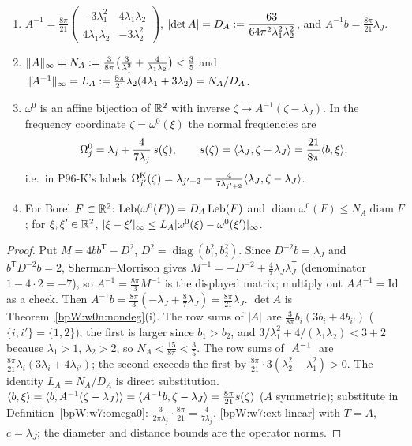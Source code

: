 \begin{lemma}\label{bpW:w7:freqcoords}
\begin{enumerate}[label=(\roman*)]
\item $A^{-1}=\frac{8\pi}{21}\begin{pmatrix}-3\lambda_1^2&4\lambda_1\lambda_2\\4\lambda_1\lambda_2&-3\lambda_2^2\end{pmatrix}$,
  $\lvert \det A\rvert=D_A:=\dfrac{63}{64\pi^2\lambda_1^2\lambda_2^2}$, and $A^{-1}b=\frac{8\pi}{21}\lambda_J$.
\item $\lVert A\rVert_\infty=N_A:=\frac3{8\pi}\bigl(\frac3{\lambda_1^2}+\frac4{\lambda_1\lambda_2}\bigr)<\frac35$ and
  $\lVert A^{-1}\rVert_\infty=L_A:=\frac{8\pi}{21}\lambda_2(4\lambda_1+3\lambda_2)=N_A/D_A$.
\item $\omega^0$ is an affine bijection of $\mathbb{R}^2$ with inverse $\zeta\mapsto A^{-1}(\zeta-\lambda_J)$. In the
  frequency coordinate $\zeta=\omega^0(\xi)$ the normal frequencies are
  \[\Omega^0_j=\lambda_j+\frac{4}{7\lambda_j}\,s(\zeta),\qquad s(\zeta)=\langle \lambda_J,\zeta-\lambda_J\rangle
  =\frac{21}{8\pi}\langle b,\xi\rangle,\]
  i.e.\ in P96-K's labels $\Omega^{\rm K}_{j'}(\zeta)=\lambda_{j'+2}+\frac{4}{7\lambda_{j'+2}}\langle \lambda_J,\zeta-\lambda_J\rangle$.
\item For Borel $F\subset\mathbb{R}^2$: $\operatorname{Leb}(\omega^0(F))=D_A\operatorname{Leb}(F)$ and
  $\operatorname{diam}\omega^0(F)\le N_A\operatorname{diam}F$; for $\xi,\xi'\in\mathbb{R}^2$,
  $\lvert \xi-\xi'\rvert_\infty\le L_A\lvert \omega^0(\xi)-\omega^0(\xi')\rvert_\infty$.
\end{enumerate}
\end{lemma}
\begin{proof}
\label{stepW:w7:inverse}
Put $M=4bb^{\mathsf T}-D^2$, $D^2=\operatorname{diag}(b_1^2,b_2^2)$. Since $D^{-2}b=\lambda_J$ and $b^{\mathsf T}D^{-2}b=2$,
Sherman--Morrison gives $M^{-1}=-D^{-2}+\frac47\lambda_J\lambda_J^{\mathsf T}$ (denominator $1-4\cdot2=-7$), so
$A^{-1}=\frac{8\pi}3M^{-1}$ is the displayed matrix; multiply out $AA^{-1}=\mathrm{Id}$ as a check. Then
$A^{-1}b=\frac{8\pi}3(-\lambda_J+\frac87\lambda_J)=\frac{8\pi}{21}\lambda_J$. $\det A$ is
Theorem~\ref{bpW:w0n:nondeg}(i).
\label{stepW:w7:norms}
The row sums of $\lvert A\rvert$ are $\frac3{8\pi}b_i(3b_i+4b_{i'})$ ($\{i,i'\}=\{1,2\}$); the first is larger since $b_1>b_2$,
and $3/\lambda_1^2+4/(\lambda_1\lambda_2)<3+2$ because $\lambda_1>1$, $\lambda_2>2$, so $N_A<\frac{15}{8\pi}<\frac35$.
The row sums of $\lvert A^{-1}\rvert$ are $\frac{8\pi}{21}\lambda_i(3\lambda_i+4\lambda_{i'})$; the second exceeds the first
by $\frac{8\pi}{21}\cdot3(\lambda_2^2-\lambda_1^2)>0$. The identity $L_A=N_A/D_A$ is direct substitution.
\label{stepW:w7:Omegazeta}
$\langle b,\xi\rangle=\langle b,A^{-1}(\zeta-\lambda_J)\rangle=\langle A^{-1}b,\zeta-\lambda_J\rangle=\frac{8\pi}{21}s(\zeta)$ ($A$ symmetric);
substitute in Definition~\ref{bpW:w7:omega0}: $\frac{3}{2\pi\lambda_j}\cdot\frac{8\pi}{21}=\frac4{7\lambda_j}$.
\label{stepW:w7:measure-affine}
\ref{bpW:w7:ext-linear} with $T=A$, $c=\lambda_J$; the diameter and distance bounds are the operator norms.
\end{proof}
